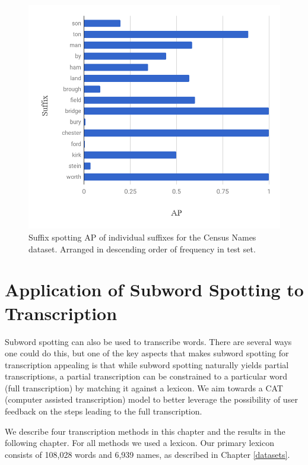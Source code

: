 \documentclass[ms,electronic,twosidetoc,letterpaper,chaptercenter,parttop,lof,lot]{byumsphd}
\begin{document}
\begin{figure}
    \centering
    \includegraphics[width=.75\textwidth]{suffix_names_ap}
    \caption{Suffix spotting AP of individual suffixes for the Census Names dataset. Arranged in descending order of frequency in test set.}
    \label{fig:names_suffix}
\end{figure}





\chapter{Application of Subword Spotting to Transcription}\label{transcription}

Subword spotting can also be used to transcribe words. There are several ways one could do this, but one of the key aspects that makes subword spotting for transcription appealing is that while subword spotting naturally yields partial transcriptions, a partial transcription can be constrained to a particular word (full transcription) by matching it against a lexicon. We aim towards a CAT (computer assisted transcription) model to better leverage the possibility of user feedback on the steps leading to the full transcription.

We describe four transcription methods in this chapter and the results in the following chapter.
For all methods we used a lexicon. Our primary lexicon consists of 108,028 words and 6,939 names, as described in Chapter \ref{datasets}.
\end{document}
